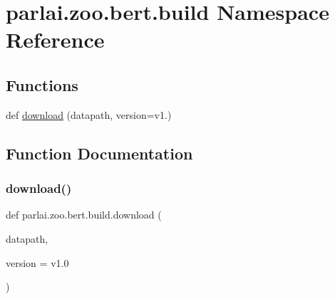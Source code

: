 \hypertarget{namespaceparlai_1_1zoo_1_1bert_1_1build}{}\section{parlai.\+zoo.\+bert.\+build Namespace Reference}
\label{namespaceparlai_1_1zoo_1_1bert_1_1build}
\subsection*{Functions}
\begin{DoxyCompactItemize}
\item 
def \hyperlink{namespaceparlai_1_1zoo_1_1bert_1_1build_a40206dbfe08db448469e0524dd093200}{download} (datapath, version=\textquotesingle{}v1.\textquotesingle{})
\end{DoxyCompactItemize}


\subsection{Function Documentation}
\mbox{\label{namespaceparlai_1_1zoo_1_1bert_1_1build_a40206dbfe08db448469e0524dd093200}} 
\subsubsection{\texorpdfstring{download()}{download()}}
{\footnotesize\ttfamily def parlai.\+zoo.\+bert.\+build.\+download (\begin{DoxyParamCaption}\item[{}]{datapath,  }\item[{}]{version = {\ttfamily \textquotesingle{}v1.0\textquotesingle{}} }\end{DoxyParamCaption})}

